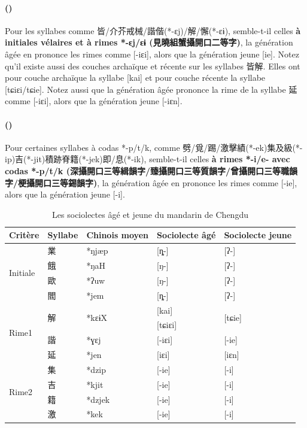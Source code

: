 \documentclass{scrbook}
\newcounter{c}[subsubsection]
\newcommand{\stpc}[1]{\stepcounter{#1}}
\newcommand{\difwenbai}{couches archaïque et récente\xspace}
\newcommand{\diflaoxin}{sociolectes âgé et jeune\xspace}
\newcommand{\termyyx}[1]{\textbf{#1}}
\begin{document}
\begin{sloppypar}
\stpc{c}\paragraph{()}
Pour les syllabes comme 皆/介芥戒械/諧偕(*-ɛj)/解/懈(*-ɛɨ), semble-t-il celles \termyyx{à initiales vélaires et à rimes *-ɛj/ɛɨ (見曉組蟹攝開口二等字)}, la génération âgée en prononce les rimes comme [-iɛi], alors que la génération jeune [ie]. Notez qu'il existe aussi des \difwenbai sur les syllabes 皆解. Elles ont pour couche archaïque la syllabe [kai] et pour couche récente la syllabe [tɕiɛi/tɕie]. Notez aussi que la génération âgée prononce la rime de la syllabe 延 comme [-iɛi], alors que la génération jeune [-iɛn].

\stpc{c}\paragraph{()}
Pour certaines syllabes à codas *-p/t/k, comme 劈/覓/踢/激擊績(*-ek)集及級(*-ip)吉(*-jit)積跡脊籍(*-jek)即/息(*-ik), semble-t-il celles \termyyx{à rimes *-i/e- avec codas *-p/t/k (深攝開口三等緝韻字/臻攝開口三等質韻字/曾攝開口三等職韻字/梗攝開口三等錫韻字)}, la génération âgée en prononce les rimes comme [-ie], alors que la génération jeune [-i].

\begin{table}[htbp]
  \centering
    \begin{tabular}{lllll}
    \toprule
    Critère & Syllabe & Chinois moyen  & Sociolecte âgé & Sociolecte jeune \\
    \midrule
    \multirow{4}[2]{*}{Initiale} & 業     & *ŋjæp & [ȵ-]  & [ʔ-] \\
          & 餓     & *ŋaH   & [ŋ-]  & [ʔ-] \\
          & 歐     & *ʔuw  & [ŋ-]  & [ʔ-] \\
          & 閻     & *jem  & [ȵ-]  & [ʔ-] \\
    \midrule
    \multirow{4}[2]{*}{Rime1} & \multirow{2}[1]{*}{解} & \multirow{2}[1]{*}{*kɛɨX} & [kai] & \multirow{2}[1]{*}{[tɕie]} \\
          &       &       & [tɕiɛi] &  \\
          & 諧     & *ɣɛj  & [-iɛi] & [-ie] \\
          & 延     & *jen  & [iɛi] & [iɛn] \\
    \midrule
    \multirow{4}[2]{*}{Rime2} & 集     & *dzip & [-ie] & [-i] \\
          & 吉     & *kjit & [-ie] & [-i] \\
          & 籍     & *dzjek & [-ie] & [-i] \\
          & 激     & *kek  & [-ie] & [-i] \\
    \bottomrule
    \end{tabular}%
  \caption{Les \diflaoxin du mandarin de Chengdu}
  \label{tab:Chengdu2}%
\end{table}%


\end{sloppypar}
\end{document}
